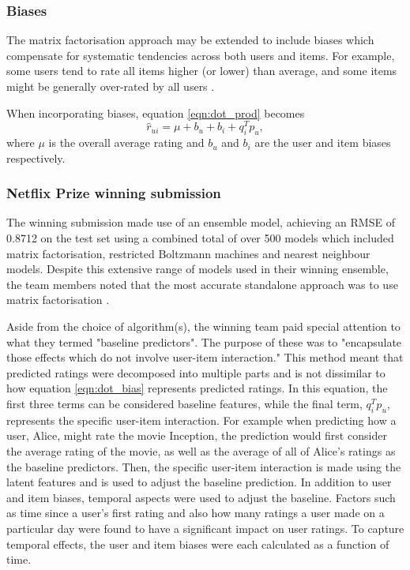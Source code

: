 \subsubsection{Biases}
The matrix factorisation approach may be extended to include biases which compensate for systematic tendencies across both users and items. For example, some users tend to rate all items higher (or lower) than average, and some items might be generally over-rated by all users \parencite{koren2009matrix}.

When incorporating biases, equation \ref{eqn:dot_prod} becomes
\begin{equation}
    \hat{r}_{ui} = \mu + b_u + b_i + q_i^T p_u,
\label{eqn:dot_bias}
\end{equation}
where $\mu$ is the overall average rating and $b_u$ and $b_i$ are the user and item biases respectively.

\subsubsection{Netflix Prize winning submission}
The winning submission made use of an ensemble model, achieving an RMSE of 0.8712 on the test set using a combined total of over 500 models which included matrix factorisation, restricted Boltzmann machines and nearest neighbour models. Despite this extensive range of models used in their winning ensemble, the team members noted that the most accurate standalone approach was to use matrix factorisation \parencite{netflix_bellkor}. 

Aside from the choice of algorithm(s), the winning team paid special attention to what they termed "baseline predictors". The purpose of these was to "encapsulate those effects which do not involve user-item interaction." This method meant that predicted ratings were decomposed into multiple parts and is not dissimilar to how equation \ref{eqn:dot_bias} represents predicted ratings. In this equation, the first three terms can be considered baseline features, while the final term, $q_i^T p_u$, represents the specific user-item interaction. For example when predicting how a user, Alice, might rate the movie Inception, the prediction would first consider the average rating of the movie, as well as the average of all of Alice's ratings as the baseline predictors. Then, the specific user-item interaction is made using the latent features and is used to adjust the baseline prediction. In addition to user and item biases, temporal aspects were used to adjust the baseline. Factors such as time since a user's first rating and also how many ratings a user made on a particular day were found to have a significant impact on user ratings. To capture temporal effects, the user and item biases were each calculated as a function of time. 

